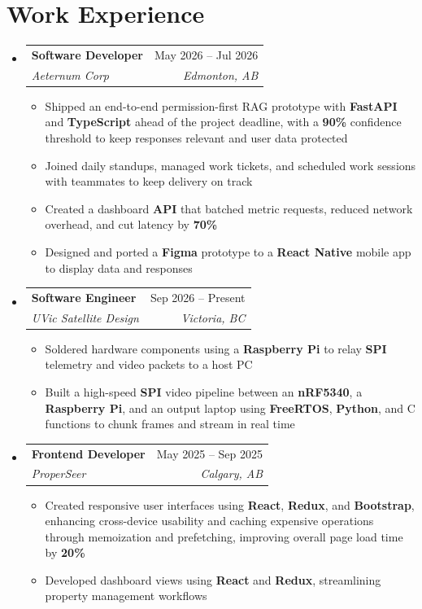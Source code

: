 \documentclass[letterpaper,10pt]{article}
\makeatletter
\newcommand{\resumeItem}[1]{
  \item\small{
    {#1 \vspace{-1pt}}
  }
}
\newcommand{\resumeSubheading}[4]{
  \vspace{-2pt}\item
    \begin{tabular*}{0.97\textwidth}[t]{l@{\extracolsep{\fill}}r}
      \textbf{#1} & #2 \\
      \textit{\small#3} & \textit{\small #4} \\
    \end{tabular*}\vspace{-6pt}
}
\newcommand{\resumeSubHeadingListStart}{\begin{itemize}[leftmargin=0.15in, label={}]}
\newcommand{\resumeSubHeadingListEnd}{\end{itemize}}
\newcommand{\resumeItemListStart}{\begin{itemize}[label=$\bullet$, itemsep=0pt, topsep=0pt, parsep=0pt]}
\newcommand{\resumeItemListEnd}{\end{itemize}\vspace{-2pt}}
\makeatother
\begin{document}
\section{Work Experience}
\resumeSubHeadingListStart
\resumeSubheading{Software Developer}{May 2026 -- Jul 2026}{Aeternum Corp}{Edmonton, AB}
\resumeItemListStart
  \resumeItem{Shipped an end-to-end permission-first RAG prototype with \textbf{FastAPI} and \textbf{TypeScript} ahead of the project deadline, with a \textbf{90\%} confidence threshold to keep responses relevant and user data protected}
  \resumeItem{Joined daily standups, managed work tickets, and scheduled work sessions with teammates to keep delivery on track}
  \resumeItem{Created a dashboard \textbf{API} that batched metric requests, reduced network overhead, and cut latency by \textbf{70\%}}
  \resumeItem{Designed and ported a \textbf{Figma} prototype to a \textbf{React Native} mobile app to display data and responses}
\resumeItemListEnd
\resumeSubheading{Software Engineer}{Sep 2026 -- Present}{UVic Satellite Design}{Victoria, BC}
\resumeItemListStart
  \resumeItem{Soldered hardware components using a \textbf{Raspberry Pi} to relay \textbf{SPI} telemetry and video packets to a host PC}
  \resumeItem{Built a high-speed \textbf{SPI} video pipeline between an \textbf{nRF5340}, a \textbf{Raspberry Pi}, and an output laptop using \textbf{FreeRTOS}, \textbf{Python}, and C functions to chunk frames and stream in real time}
\resumeItemListEnd
\resumeSubheading{Frontend Developer}{May 2025 -- Sep 2025}{ProperSeer}{Calgary, AB}
\resumeItemListStart
  \resumeItem{Created responsive user interfaces using \textbf{React}, \textbf{Redux}, and \textbf{Bootstrap}, enhancing cross-device usability and caching expensive operations through memoization and prefetching, improving overall page load time by \textbf{20\%}}
  \resumeItem{Developed dashboard views using \textbf{React} and \textbf{Redux}, streamlining property management workflows}
\resumeItemListEnd
\resumeSubHeadingListEnd

\end{document}

